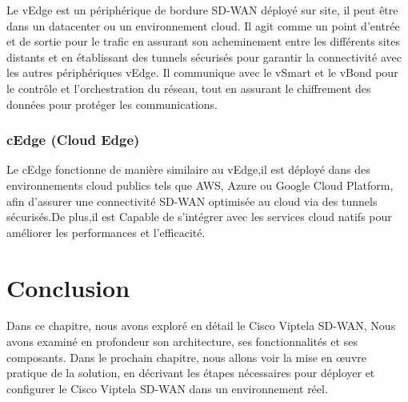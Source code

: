 Le vEdge est un périphérique de bordure SD-WAN déployé sur site, il peut être  dans un datacenter ou un environnement cloud. Il agit comme un point d'entrée et de sortie pour le trafic en  assurant son acheminement entre les différents sites distants et en  établissant des tunnels sécurisés pour garantir la connectivité avec les autres périphériques vEdge. Il communique avec le vSmart et le vBond pour le contrôle et l'orchestration du réseau, tout en assurant le chiffrement des données pour protéger les communications.

\subsubsection{  cEdge  (Cloud Edge) }


Le cEdge fonctionne de manière similaire au vEdge,il est déployé dans des environnements cloud publics tels que AWS, Azure ou Google Cloud Platform, afin d'assurer une connectivité SD-WAN optimisée au cloud via des tunnels sécurisés.De plus,il est Capable de s'intégrer avec les services cloud natifs pour améliorer les performances et l'efficacité.




\section*{Conclusion }

Dans ce chapitre, nous avons exploré en détail le Cisco Viptela SD-WAN, Nous avons examiné en profondeur son architecture, ses fonctionnalités et ses composants. Dans le prochain chapitre, nous allons voir  la mise en œuvre pratique de la solution, en décrivant les étapes nécessaires pour déployer et configurer le Cisco Viptela SD-WAN dans un environnement réel.